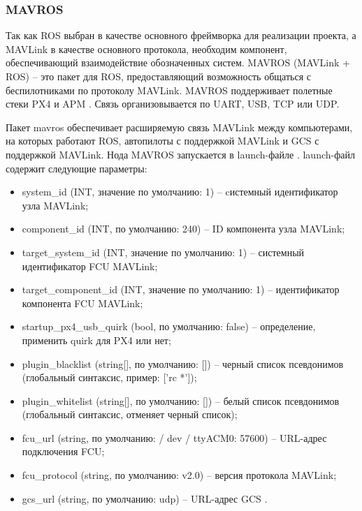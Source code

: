 \subsubsection{MAVROS}
Так как ROS выбран в качестве основного фреймворка для реализации проекта, а MAVLink в качестве основного протокола, необходим компонент, обеспечивающий взаимодействие обозначенных систем.
MAVROS (MAVLink + ROS) -- это пакет для ROS, предоставляющий возможность общаться с беспилотниками по протоколу MAVLink. MAVROS поддерживает полетные стеки PX4 и APM \cite{px4}. Связь организовывается по UART, USB, TCP или UDP.

Пакет mavros обеспечивает расширяемую связь MAVLink между компьютерами, на которых работают ROS, автопилоты с поддержкой MAVLink и GCS с поддержкой MAVLink. Нода MAVROS запускается в launch-файле \cite{clover}.
launch-файл содержит следующие параметры:
\begin{itemize}
\item  system\_id (INT, значение по умолчанию: 1) -- cистемный идентификатор узла MAVLink;

\item  component\_id (INT, по умолчанию: 240) -- ID компонента узла MAV\-Link;

\item  target\_system\_id (INT, значение по умолчанию: 1) -- системный идентификатор FCU MAVLink;

\item  target\_component\_id (INT, значение по умолчанию: 1) -- идентификатор компонента FCU MAVLink;

\item  startup\_px4\_usb\_quirk (bool, по умолчанию: false) -- определение, применить quirk для PX4 или нет;

\item  plugin\_blacklist (string[], по умолчанию: []) -- черный список псевдонимов (глобальный синтаксис, пример: ['rc *']);

\item  plugin\_whitelist (string[], по умолчанию: []) -- белый список псевдонимов (глобальный синтаксис, отменяет черный список);

\item  fcu\_url (string, по умолчанию: / dev / ttyACM0: 57600) -- URL-адрес подключения FCU;

\item  fcu\_protocol (string, по умолчанию: v2.0) -- версия протокола MAVLink;

\item  gcs\_url (string, по умолчанию: udp) -- URL-адрес GCS \cite{ros}.
\end{itemize}

